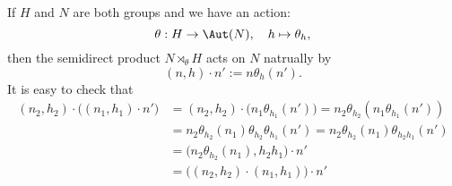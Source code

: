 \begin{remark}
If $H$ and $N$ are both groups and we have an action:
\[\theta:H\to\Aut(N),\quad h\mapsto\theta_h,\]
then the semidirect product $N\rtimes_\theta H$ acts on $N$ natrually by
\[(n,h)\cdot n':=n\theta_h(n').\]
It is easy to check that
\begin{align*}
(n_2,h_2)\cdot\big((n_1,h_1)\cdot n'\big)&=(n_2,h_2)\cdot\big(n_1\theta_{h_1}(n')\big)=n_2\theta_{h_2}(n_1\theta_{h_1}(n'))\\
&=n_2\theta_{h_2}(n_1)\theta_{h_2}\theta_{h_1}(n')=n_2\theta_{h_2}(n_1)\theta_{h_2h_1}(n')\\
&=\big(n_2\theta_{h_2}(n_1),h_2h_1\big)\cdot n'\\
&=\big((n_2,h_2)\cdot(n_1,h_1)\big)\cdot n'
\end{align*}
\end{remark}